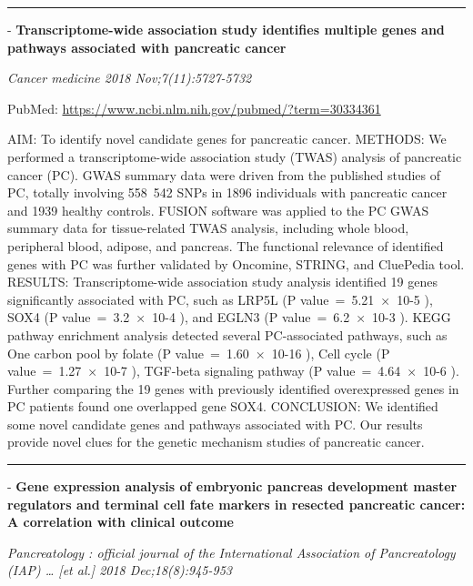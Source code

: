 \documentclass[]{article}
\begin{document}
{}

{}

\begin{center}\rule{0.5\linewidth}{\linethickness}\end{center}

 - \textbf{Transcriptome-wide association study identifies multiple
genes and pathways associated with pancreatic cancer}

\emph{Cancer medicine 2018 Nov;7(11):5727-5732}

PubMed: \url{https://www.ncbi.nlm.nih.gov/pubmed/?term=30334361}

AIM: To identify novel candidate genes for pancreatic cancer. METHODS:
We performed a transcriptome-wide association study (TWAS) analysis of
pancreatic cancer (PC). GWAS summary data were driven from the published
studies of PC, totally involving 558~542 SNPs in 1896 individuals with
pancreatic cancer and 1939 healthy controls. FUSION software was applied
to the PC GWAS summary data for tissue-related TWAS analysis, including
whole blood, peripheral blood, adipose, and pancreas. The functional
relevance of identified genes with PC was further validated by Oncomine,
STRING, and CluePedia tool. RESULTS: Transcriptome-wide association
study analysis identified 19 genes significantly associated with PC,
such as LRP5L (P value~=~5.21~×~10-5 ), SOX4 (P value~=~3.2~×~10-4 ),
and EGLN3 (P value~=~6.2~×~10-3 ). KEGG pathway enrichment analysis
detected several PC-associated pathways, such as One carbon pool by
folate (P value~=~1.60~×~10-16 ), Cell cycle (P value~=~1.27~×~10-7 ),
TGF-beta signaling pathway (P value~=~4.64~×~10-6 ). Further comparing
the 19 genes with previously identified overexpressed genes in PC
patients found one overlapped gene SOX4. CONCLUSION: We identified some
novel candidate genes and pathways associated with PC. Our results
provide novel clues for the genetic mechanism studies of pancreatic
cancer.

{}

{}

\begin{center}\rule{0.5\linewidth}{\linethickness}\end{center}

 - \textbf{Gene expression analysis of embryonic pancreas development
master regulators and terminal cell fate markers in resected pancreatic
cancer: A correlation with clinical outcome}

\emph{Pancreatology : official journal of the International Association
of Pancreatology (IAP) \ldots{} {[}et al.{]} 2018 Dec;18(8):945-953}
\end{document}

